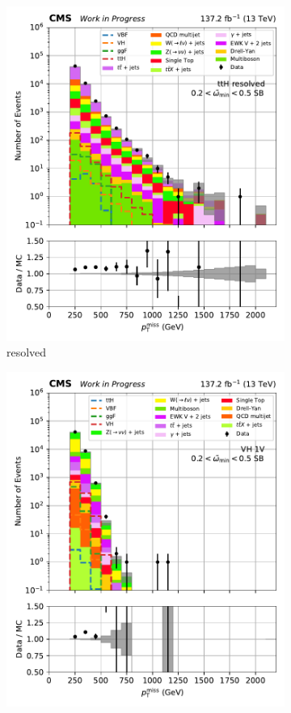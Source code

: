 \begin{figure}[htbp]
\begin{subfigure}[b]{0.24\textwidth}
        \includegraphics[width=\textwidth]{figures/region_plots/2016to18/sideband_4/ttH_resolved.pdf}
        \caption{\ttH resolved}
    \end{subfigure}
    \begin{subfigure}[b]{0.24\textwidth}
        \includegraphics[width=\textwidth]{figures/region_plots/2016to18/sideband_4/VH_1V.pdf}

\end{subfigure}
\end{figure}

